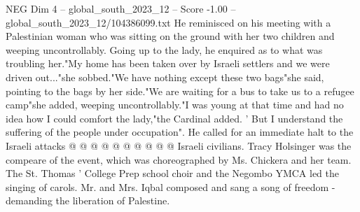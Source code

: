 \begin{textsample}{NEG Dim 4 – global\_south\_2023\_12 – Score -1.00 – global\_south\_2023\_12/104386099.txt}
He reminisced on his meeting with a Palestinian woman who was sitting on the ground with her two children and weeping uncontrollably.
Going up to the lady, he enquired as to what was troubling her."My home has been taken over by Israeli settlers and we were driven out..."she sobbed."We have nothing except these two bags"she said, pointing to the bags by her side."We are waiting for a bus to take us to a refugee camp"she added, weeping uncontrollably."I was young at that time and had no idea how I could comfort the lady,"the Cardinal added. ' But I understand the suffering of the people under occupation".
He called for an immediate halt to the Israeli attacks @ @ @ @ @ @ @ @ @ @ Israeli civilians.
Tracy Holsinger was the compeare of the event, which was choreographed by Ms.
Chickera and her team.
The St.
Thomas ' College Prep school choir and the Negombo YMCA led the singing of carols.
Mr. and Mrs.
Iqbal composed and sang a song of freedom -demanding the liberation of Palestine.

\end{textsample}

